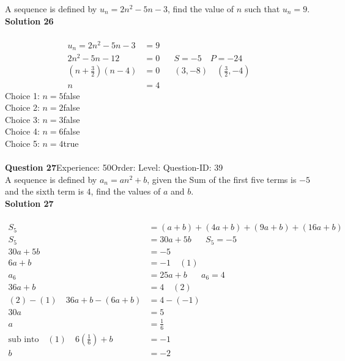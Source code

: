 \documentclass{article}
\begin{document}
A sequence is defined by $u_n=2n^2-5n-3$, find the value of $n$ such that $u_n=9$.\\[4pt]
\noindent\textbf{Solution 26}\\[2pt]
\\[-35pt]\begin{align*}
u_n=2n^2-5n-3&=9\\[2pt]
2n^2-5n-12&=0\hspace{20pt}S=-5 \quad P=-24\\[2pt]
\left(n+\displaystyle\frac{3}{2}\right)(n-4)&=0\hspace{20pt} (3,-8)\quad\left(\displaystyle\frac{3}{2},-4\right)\\[2pt]
n&=4
\end{align*}
Choice 1: \hspace{20pt}$n=5$\hspace{20pt}false\\
Choice 2: \hspace{20pt}$n=2$\hspace{20pt}false\\
Choice 3: \hspace{20pt}$n=3$\hspace{20pt}false\\
Choice 4: \hspace{20pt}$n=6$\hspace{20pt}false\\
Choice 5: \hspace{20pt}$n=4$\hspace{20pt}true\\
\\[4pt]
\noindent\textbf{Question 27}\hspace{20pt}Experience: 50\hspace{20pt}Order: \hspace{20pt}Level: \hspace{20pt}Question-ID: 39\\[2pt]
A sequence is defined by $a_n=an^2+b$, given the Sum of the first five terms is $-5$ and the sixth term is $4$, find the values of $a$ and $b$.\\[4pt]
\noindent\textbf{Solution 27}\\[2pt]
\\[-35pt]\begin{align*}
S_5&=(a+b)+(4a+b)+(9a+b)+(16a+b)\\[2pt]
S_5&=30a+5b\hspace{20pt} S_5=-5\\[2pt]
30a+5b&=-5\\[2pt]
6a+b&=-1\quad (1)\\[12pt]
a_6&=25a+b\hspace{20pt}a_6=4\\[2pt]
36a+b&=4\quad (2)\\[12pt]
(2)-(1)\quad 36a+b-(6a+b)&=4-(-1)\\[2pt]
30a&=5\\[2pt]
a&=\displaystyle\frac{1}{6}\\[12pt]
\text{sub into}\quad (1) \quad 6\left(\displaystyle\frac{1}{6}\right)+b&=-1\\[2pt]
b&=-2\\[2pt]
\end{align*}
\end{document}
